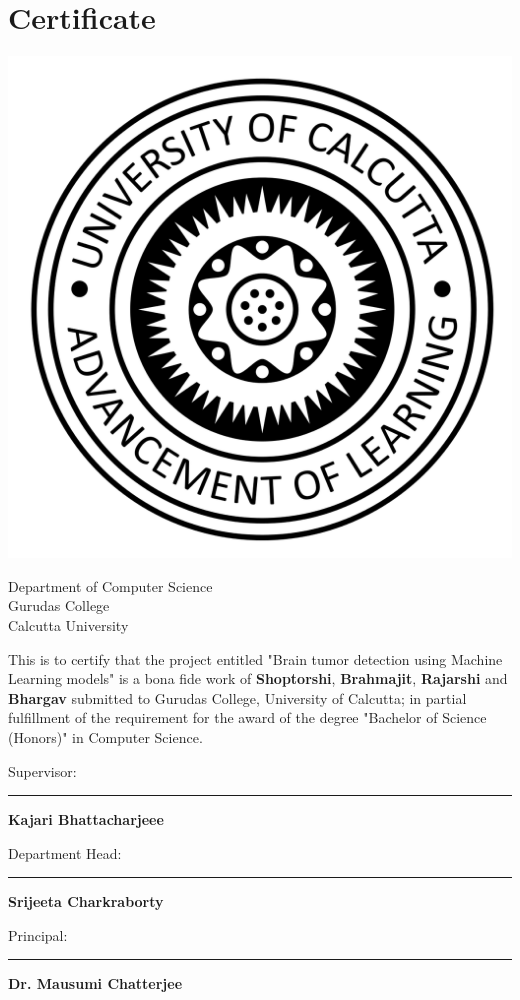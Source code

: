 \documentclass[12pt]{article}
\begin{document}
	\section[certificate]{\hfill \Huge Certificate \hfill}
	\thispagestyle{empty}


	\begin{center}
		\vspace{1cm}

		\includegraphics[width=0.3\linewidth]{imgs/cu_logo.png}

		\vspace{1cm}

		\Large
		Department of Computer Science\\
		Gurudas College\\
		Calcutta University\\
	\end{center}

	\vspace{1.8cm}
	This is to certify that the project entitled "Brain tumor detection using
	Machine Learning models" is a bona fide work of \textbf{Shoptorshi},
	\textbf{Brahmajit}, \textbf{Rajarshi} and \textbf{Bhargav} submitted to
	Gurudas College, University of Calcutta; in partial fulfillment of the
	requirement for the award of the degree "Bachelor of Science (Honors)" in
	Computer Science.
	\vfill

	\begin{multicols}{2}

		Supervisor:

		\rule{5cm}{0.4pt}

		\textbf{Kajari Bhattacharjeee}

		\vspace{1cm}

		Department Head:

		\rule{5cm}{0.4pt}

		\textbf{Srijeeta Charkraborty}


		\columnbreak

		Principal:

		\rule{5cm}{0.4pt}

		\textbf{Dr. Mausumi Chatterjee}

	\end{multicols}
\end{document}
